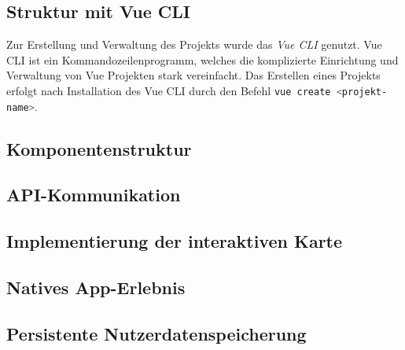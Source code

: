 \subsection{Struktur mit Vue CLI}

Zur Erstellung und Verwaltung des Projekts wurde das \textit{Vue CLI} genutzt.
Vue CLI ist ein Kommandozeilenprogramm, welches die komplizierte Einrichtung und
Verwaltung von Vue Projekten stark vereinfacht. Das Erstellen eines Projekts
erfolgt nach Installation des Vue CLI durch den Befehl \lstinline[style=code,
    language=bash, style=inline]{vue create <projekt-name>}.

\subsection{Komponentenstruktur}

\subsection{API-Kommunikation}

\subsection{Implementierung der interaktiven Karte}

\subsection{Natives App-Erlebnis}

\subsection{Persistente Nutzerdatenspeicherung}








